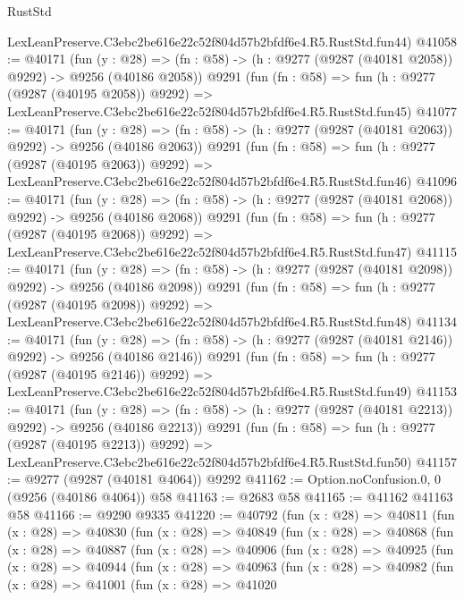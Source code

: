 \begin{lexlean}{RustStd}
\begin{coremodule}
    LexLeanPreserve.C3ebc2be616e22c52f804d57b2bfdf6e4.R5.RustStd.fun44)
@41058 := @40171
    (fun (y : @28) =>
    (fn : @58) -> (h : @9277 (@9287 (@40181 @2058)) @9292) -> @9256 (@40186 @2058))
    @9291
    (fun (fn : @58) =>
    fun (h : @9277 (@9287 (@40195 @2058)) @9292) =>
    LexLeanPreserve.C3ebc2be616e22c52f804d57b2bfdf6e4.R5.RustStd.fun45)
@41077 := @40171
    (fun (y : @28) =>
    (fn : @58) -> (h : @9277 (@9287 (@40181 @2063)) @9292) -> @9256 (@40186 @2063))
    @9291
    (fun (fn : @58) =>
    fun (h : @9277 (@9287 (@40195 @2063)) @9292) =>
    LexLeanPreserve.C3ebc2be616e22c52f804d57b2bfdf6e4.R5.RustStd.fun46)
@41096 := @40171
    (fun (y : @28) =>
    (fn : @58) -> (h : @9277 (@9287 (@40181 @2068)) @9292) -> @9256 (@40186 @2068))
    @9291
    (fun (fn : @58) =>
    fun (h : @9277 (@9287 (@40195 @2068)) @9292) =>
    LexLeanPreserve.C3ebc2be616e22c52f804d57b2bfdf6e4.R5.RustStd.fun47)
@41115 := @40171
    (fun (y : @28) =>
    (fn : @58) -> (h : @9277 (@9287 (@40181 @2098)) @9292) -> @9256 (@40186 @2098))
    @9291
    (fun (fn : @58) =>
    fun (h : @9277 (@9287 (@40195 @2098)) @9292) =>
    LexLeanPreserve.C3ebc2be616e22c52f804d57b2bfdf6e4.R5.RustStd.fun48)
@41134 := @40171
    (fun (y : @28) =>
    (fn : @58) -> (h : @9277 (@9287 (@40181 @2146)) @9292) -> @9256 (@40186 @2146))
    @9291
    (fun (fn : @58) =>
    fun (h : @9277 (@9287 (@40195 @2146)) @9292) =>
    LexLeanPreserve.C3ebc2be616e22c52f804d57b2bfdf6e4.R5.RustStd.fun49)
@41153 := @40171
    (fun (y : @28) =>
    (fn : @58) -> (h : @9277 (@9287 (@40181 @2213)) @9292) -> @9256 (@40186 @2213))
    @9291
    (fun (fn : @58) =>
    fun (h : @9277 (@9287 (@40195 @2213)) @9292) =>
    LexLeanPreserve.C3ebc2be616e22c52f804d57b2bfdf6e4.R5.RustStd.fun50)
@41157 := @9277 (@9287 (@40181 @4064)) @9292
@41162 := Option.noConfusion.{0, 0} (@9256 (@40186 @4064)) @58
@41163 := @2683 @58
@41165 := @41162 @41163 @58
@41166 := @9290 @9335
@41220 := @40792
    (fun (x : @28) =>
    @40811
      (fun (x : @28) =>
      @40830
        (fun (x : @28) =>
        @40849
          (fun (x : @28) =>
          @40868
            (fun (x : @28) =>
            @40887
              (fun (x : @28) =>
              @40906
                (fun (x : @28) =>
                @40925
                  (fun (x : @28) =>
                  @40944
                    (fun (x : @28) =>
                    @40963
                      (fun (x : @28) =>
                      @40982
                        (fun (x : @28) =>
                        @41001
                          (fun (x : @28) =>
                          @41020

\end{coremodule}
\end{lexlean}
